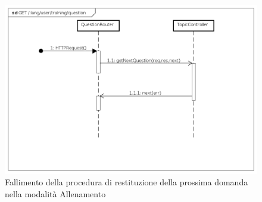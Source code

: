\begin{itemize}
\begin{figure}[ht]
	\centering
	\includegraphics[scale=0.45]{UML/DiagrammiDiSequenza/Back-end/GET__lang_user_training_question_failure.png}
	\caption{Fallimento della procedura di restituzione della prossima domanda nella modalità Allenamento}
\end{figure}
\FloatBarrier

\end{itemize}


